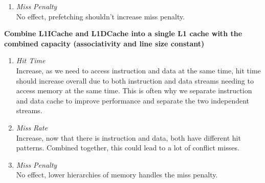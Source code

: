 \documentclass[11pt]{article}
\begin{document}
\begin{Parts}
\begin{enumerate}[i]
		\item \textit{Miss Penalty} \\
		      No effect, prefetching shouldn't increase miss penalty.
	\end{enumerate}
	\Part \textbf{Combine L1ICache and L1DCache into a single L1 cache with the combined capacity
		(associativity and line size constant)} \\
	\begin{enumerate}[i]
		\item \textit{Hit Time} \\
		      Increase, as we need to access instruction and data at the same time, hit time should increase overall due to both instruction and data streams needing to access memory at the same time. This is often why we separate instruction and data cache to improve performance and separate the two independent streams.
		\item \textit{Miss Rate} \\
		      Increase, now that there is instruction and data, both have different hit patterns. Combined together, this could lead to a lot of conflict misses.
		\item \textit{Miss Penalty} \\
		      No effect, lower hierarchies of memory handles the miss penalty.
	\end{enumerate}
\end{Parts}
\newpage



\end{document}
